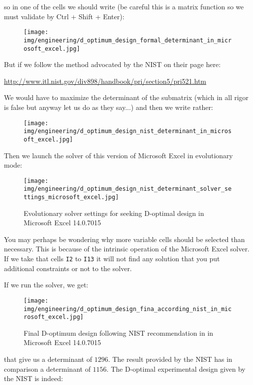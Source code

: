	so in one of the cells we should write (be careful this is a matrix function so we must validate by Ctrl + Shift + Enter):
	\begin{figure}[H]
		\centering
		\texttt{[image: img/engineering/d\_optimum\_design\_formal\_determinant\_in\_microsoft\_excel.jpg]}
	\end{figure}
	But if we follow the method advocated by the NIST on their page here:
	\begin{center}
	\url{http://www.itl.nist.gov/div898/handbook/pri/section5/pri521.htm}
	\end{center}
	We would have to maximize the determinant of the submatrix (which in all rigor is false but anyway let us do as they say...) and then we write rather:
	\begin{figure}[H]
		\centering
		\texttt{[image: img/engineering/d\_optimum\_design\_nist\_determinant\_in\_microsoft\_excel.jpg]}
	\end{figure}
	Then we launch the solver of this version of Microsoft Excel in evolutionary mode:
	\begin{figure}[H]
		\centering
		\texttt{[image: img/engineering/d\_optimum\_design\_nist\_determinant\_solver\_settings\_microsoft\_excel.jpg]}
		\caption{Evolutionary solver settings for seeking D-optimal design in Microsoft Excel 14.0.7015}
	\end{figure}
	You may perhaps be wondering why more variable cells should be selected than necessary. This is because of the intrinsic operation of the Microsoft Excel solver. If we take that cells \texttt{I2} to \texttt{I13} it will not find any solution that you put additional constraints or not to the solver.

	If we run the solver, we get:
	\begin{figure}[H]
		\centering
		\texttt{[image: img/engineering/d\_optimum\_design\_fina\_according\_nist\_in\_microsoft\_excel.jpg]}
		\caption{Final D-optimum design following NIST recommendation in in Microsoft Excel 14.0.7015}
	\end{figure}
	that give us a determinant of $1296$. The result provided by  the NIST has in comparison a determinant of $1156$. The D-optimal experimental design given by the NIST is indeed:
	
